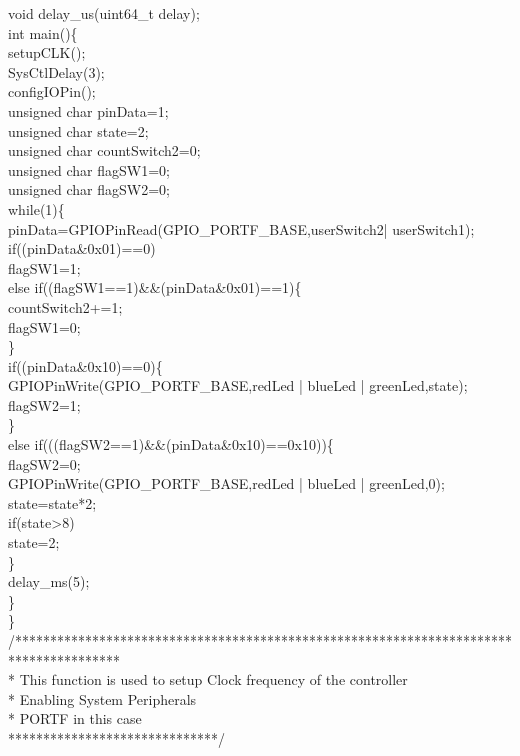 \documentclass[a4paper,10pt,oneside]{article}
\begin{document}
{		void delay\_us(uint64\_t delay);\\
		int main()\{\\
			setupCLK();\\
			SysCtlDelay(3);\\
			configIOPin();\\
			unsigned char pinData=1;\\
			unsigned char state=2;\\
			unsigned char countSwitch2=0;\\
			unsigned char flagSW1=0;\\
			unsigned char flagSW2=0;\\
			while(1)\{\\
				pinData=GPIOPinRead(GPIO\_PORTF\_BASE,userSwitch2| userSwitch1);\\
				if((pinData\&0x01)==0)\\
				flagSW1=1;\\
				else if((flagSW1==1)\&\&(pinData\&0x01)==1)\{\\
					countSwitch2+=1;\\
					flagSW1=0;\\
				\}\\
				if((pinData\&0x10)==0)\{\\
					GPIOPinWrite(GPIO\_PORTF\_BASE,redLed | blueLed | greenLed,state);\\
					flagSW2=1;\\
				\}\\
				else if(((flagSW2==1)\&\&(pinData\&0x10)==0x10))\{\\
					flagSW2=0;\\
					GPIOPinWrite(GPIO\_PORTF\_BASE,redLed | blueLed | greenLed,0);\\
					state=state*2;\\
					if(state>8)\\
					state=2;\\
				\}\\
				delay\_ms(5);\\
			\}\\
		\}\\
		/***************************************************************************************\\
		* This function is used to setup Clock frequency of the controller\\
		* Enabling System Peripherals\\
		* PORTF in this case\\
		******************************/\\
}
\end{document}
